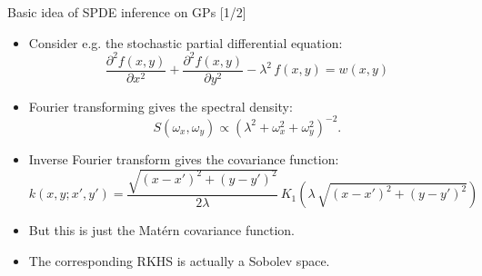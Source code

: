 \documentclass[first=dgreen,second=purple,presentation]{elecslides}
\begin{document}
\begin{frame}{Basic idea of SPDE inference on GPs [1/2]}

\begin{itemize}[<+->]
\item Consider e.g. the \alert{stochastic partial differential equation}:
\begin{equation}
  \frac{\partial^2 f(x,y)}{\partial x^2}
  + \frac{\partial^2 f(x,y)}{\partial y^2} -\lambda^2 \, f(x,y)
  = w(x,y)
\nonumber
\end{equation}

\item Fourier transforming gives the \alert{spectral density}:
%
\begin{equation}
  S(\omega_x,\omega_y)  \propto 
     \left( \lambda^2 + \omega_x^2 + \omega_y^2 \right)^{-2}. 
\nonumber
\end{equation}
%
\item Inverse Fourier transform gives the \alert{covariance function}:
{\small
\begin{equation}
  k(x,y;x',y')
  = \frac{\sqrt{(x-x')^2 + (y-y')^2}}{2\lambda} \, 
  K_1(\lambda \, \sqrt{(x-x')^2 + (y-y')^2})
\nonumber
\end{equation}
}

\item But this is just the \alert{Mat\'ern covariance function}.

\item The corresponding \alert{RKHS} is actually a \alert{Sobolev space}.

\end{itemize}

\end{frame}
\end{document}
